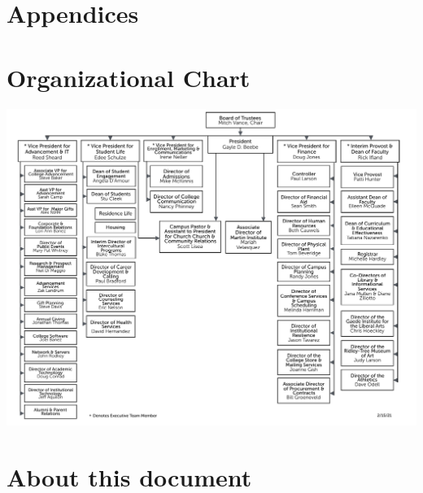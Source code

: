 \documentclass[letterpaper, 11pt]{article}
\begin{document}

\newpage
\appendix
{}
\section*{Appendices}
\section{Organizational Chart}
	\label{sec:OrgChart}
	\begin{center}
		\includegraphics[width=\textwidth]{images/orgchart.pdf}
	\end{center}
\section{About this document}
	\label{sec:AboutThisDocument}
\end{document}
